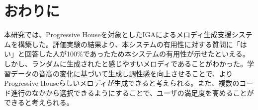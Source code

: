 \chapter{おわりに}
本研究では、Progressive Houseを対象としたIGAによるメロディ生成支援システムを構築した。評価実験の結果より、本システムの有用性に対する質問に「はい」と回答した人が100\%であったため本システムの有用性が示せたといえる。しかし、ランダムに生成されたと感じやすいメロディであることがわかった。学習データの音高の変化に基づいて生成し調性感を向上させることで、よりProgressive Houseらしいメロディが生成できると考えられる。また、複数のコード進行のなかから選択できるようにすることで、ユーザの満足度を高めることができると考えられる。
